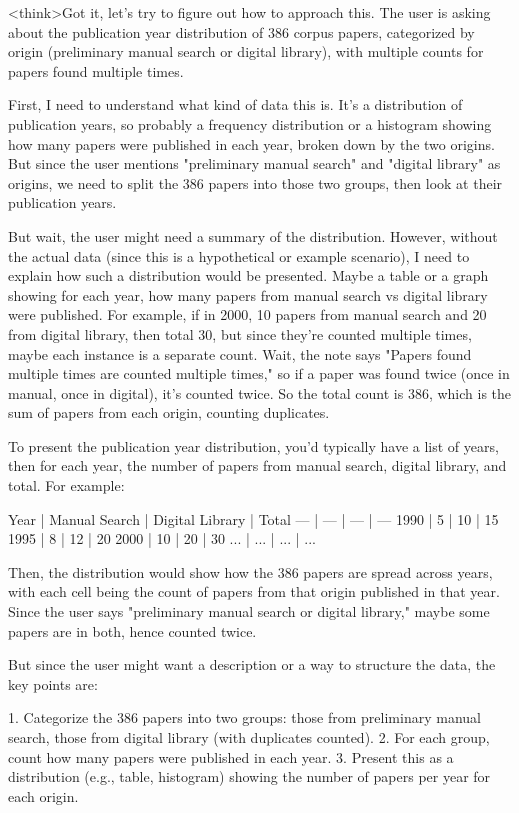 <think>Got it, let's try to figure out how to approach this. The user is asking about the publication year distribution of 386 corpus papers, categorized by origin (preliminary manual search or digital library), with multiple counts for papers found multiple times. 

First, I need to understand what kind of data this is. It's a distribution of publication years, so probably a frequency distribution or a histogram showing how many papers were published in each year, broken down by the two origins. But since the user mentions "preliminary manual search" and "digital library" as origins, we need to split the 386 papers into those two groups, then look at their publication years.

But wait, the user might need a summary of the distribution. However, without the actual data (since this is a hypothetical or example scenario), I need to explain how such a distribution would be presented. Maybe a table or a graph showing for each year, how many papers from manual search vs digital library were published. For example, if in 2000, 10 papers from manual search and 20 from digital library, then total 30, but since they're counted multiple times, maybe each instance is a separate count. Wait, the note says "Papers found multiple times are counted multiple times," so if a paper was found twice (once in manual, once in digital), it's counted twice. So the total count is 386, which is the sum of papers from each origin, counting duplicates.

To present the publication year distribution, you'd typically have a list of years, then for each year, the number of papers from manual search, digital library, and total. For example:

Year | Manual Search | Digital Library | Total
--- | --- | --- | ---
1990 | 5 | 10 | 15
1995 | 8 | 12 | 20
2000 | 10 | 20 | 30
... | ... | ... | ...

Then, the distribution would show how the 386 papers are spread across years, with each cell being the count of papers from that origin published in that year. Since the user says "preliminary manual search or digital library," maybe some papers are in both, hence counted twice.

But since the user might want a description or a way to structure the data, the key points are:

1. Categorize the 386 papers into two groups: those from preliminary manual search, those from digital library (with duplicates counted).
2. For each group, count how many papers were published in each year.
3. Present this as a distribution (e.g., table, histogram) showing the number of papers per year for each origin.

